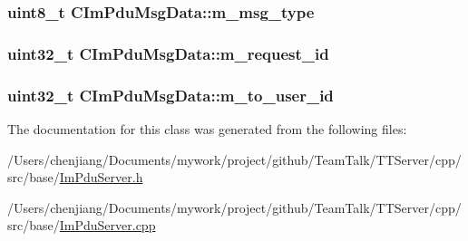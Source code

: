 \subsubsection[{m\+\_\+msg\+\_\+type}]{\setlength{\rightskip}{0pt plus 5cm}uint8\+\_\+t C\+Im\+Pdu\+Msg\+Data\+::m\+\_\+msg\+\_\+type\hspace{0.3cm}{\ttfamily [private]}}\label{class_c_im_pdu_msg_data_a21c4d17025f90f353257cbee97def4a1}
\hypertarget{class_c_im_pdu_msg_data_a09b278fb291db3ac9e1a912ce2835b50}{}
\subsubsection[{m\+\_\+request\+\_\+id}]{\setlength{\rightskip}{0pt plus 5cm}uint32\+\_\+t C\+Im\+Pdu\+Msg\+Data\+::m\+\_\+request\+\_\+id\hspace{0.3cm}{\ttfamily [private]}}\label{class_c_im_pdu_msg_data_a09b278fb291db3ac9e1a912ce2835b50}
\hypertarget{class_c_im_pdu_msg_data_a0e5ed249696472f3feef4a7b4e54f7fc}{}
\subsubsection[{m\+\_\+to\+\_\+user\+\_\+id}]{\setlength{\rightskip}{0pt plus 5cm}uint32\+\_\+t C\+Im\+Pdu\+Msg\+Data\+::m\+\_\+to\+\_\+user\+\_\+id\hspace{0.3cm}{\ttfamily [private]}}\label{class_c_im_pdu_msg_data_a0e5ed249696472f3feef4a7b4e54f7fc}


The documentation for this class was generated from the following files\+:\begin{DoxyCompactItemize}
\item 
/\+Users/chenjiang/\+Documents/mywork/project/github/\+Team\+Talk/\+T\+T\+Server/cpp/src/base/\hyperlink{_im_pdu_server_8h}{Im\+Pdu\+Server.\+h}\item 
/\+Users/chenjiang/\+Documents/mywork/project/github/\+Team\+Talk/\+T\+T\+Server/cpp/src/base/\hyperlink{_im_pdu_server_8cpp}{Im\+Pdu\+Server.\+cpp}\end{DoxyCompactItemize}
